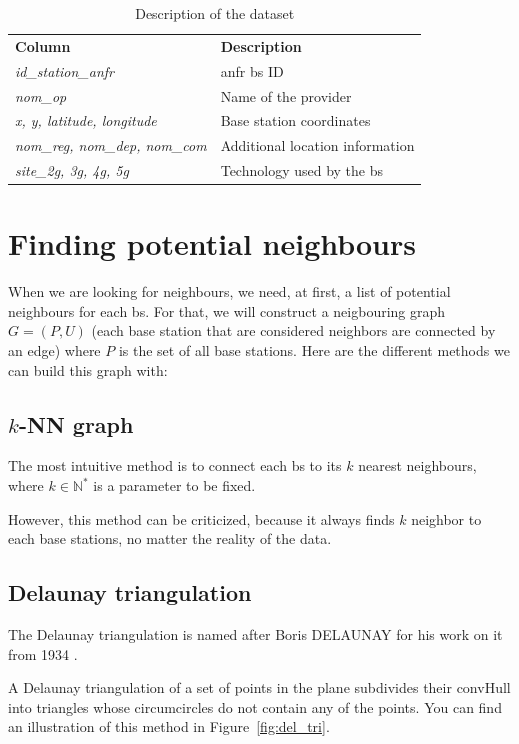\documentclass[lettersize,journal,english]{IEEEtran}
\begin{document}
\begin{table}[!b]
    \centering
    \caption{Description of the dataset}
    \label{table:data_columns}
    \begin{tabular}{ll}
        \toprule
        \textbf{Column} & \textbf{Description} \\
        \cmidrule(lr){1-2}
        \textsl{id\_station\_anfr} & \acrshort{anfr} \acrshort{bs} ID \\ 
        \textsl{nom\_op} & Name of the provider \\
        \textsl{x, y, latitude, longitude} & Base station coordinates \\ 
        \textsl{nom\_reg, nom\_dep, nom\_com} & Additional location information \\  
        \textsl{site\_2g, 3g, 4g, 5g} & Technology used by the \acrshort{bs} \\ 
        \bottomrule
    \end{tabular}
\end{table}

\section{Finding potential neighbours}
\noindent When we are looking for neighbours, we need, at first, a list of potential neighbours for each \acrfull{bs}.
For that, we will construct a neigbouring graph $G = (P, U)$ (each base station that are considered neighbors are
connected by an edge) where $P$ is the set of all base stations. 
Here are the different methods we can build this graph with:

\subsection{$k$-NN graph}
\noindent The most intuitive method is to connect each \acrshort{bs} to its $k$ nearest neighbours, where $k \in \mathbb{N}^*$ 
is a parameter to be fixed. 

However, this method can be criticized, because it always finds $k$ neighbor to each base stations, no matter the reality of the 
data.

\subsection{Delaunay triangulation}
\noindent The Delaunay triangulation is named after Boris DELAUNAY for his work on it from 1934 \cite{art_delaunay}.

A Delaunay triangulation of a set of points in the plane subdivides their \gls{convHull} into triangles whose circumcircles 
do not contain any of the points. You can find an illustration of this method in Figure~\ref{fig:del_tri}.
\end{document}
